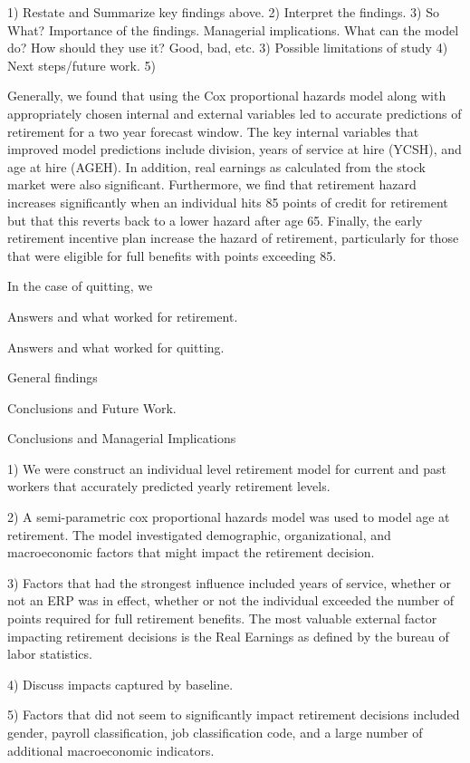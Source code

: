 \documentclass[12pt,letterpaper]{article}
\begin{document}
1) Restate and Summarize key findings above.
2) Interpret the findings.  
3) So What?  Importance of the findings. Managerial implications. What can the model do?
  How should they use it?  Good, bad, etc.
3) Possible limitations of study
4) Next steps/future work.
5) 

Generally, we found that using the Cox proportional hazards model along with appropriately chosen internal and external variables led to accurate predictions of retirement for a two year forecast window.  The key internal variables that improved model predictions include division, years of service at hire (YCSH), and age at hire (AGEH).  In addition, real earnings as calculated from the stock market were also significant.  Furthermore, we find that retirement hazard increases significantly when an individual hits 85 points of credit for retirement but that this reverts back to a lower hazard after age 65.  Finally, the early retirement incentive plan increase the hazard of retirement, particularly for those that were eligible for full benefits with points exceeding 85.

In the case of quitting, we

Answers and what worked for retirement.

Answers and what worked for quitting.

General findings

Conclusions and Future Work.




Conclusions and Managerial Implications

1) We were construct an individual level retirement model for current and past workers that accurately predicted yearly retirement levels.

2) A semi-parametric cox proportional hazards model was used to model age at retirement.  The model investigated demographic, organizational, and macroeconomic factors that might impact the retirement decision.

3) Factors that had the strongest influence included years of service, whether or not an ERP was in effect, whether or not the individual exceeded the number of points required for full retirement benefits.  The most valuable external factor impacting retirement decisions is the Real Earnings as defined by the bureau of labor statistics.

4) Discuss impacts captured by baseline.

5) Factors that did not seem to significantly impact retirement decisions included gender, payroll classification, job classification code, and a large number of additional macroeconomic indicators.
\end{document}
